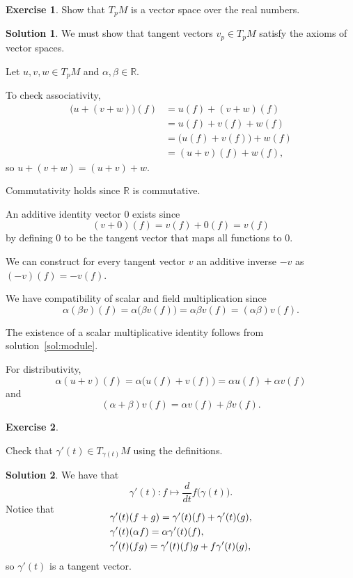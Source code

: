\documentclass[11pt, a4paper]{report}
\theoremstyle{definition}
\newtheorem{exercise}{Exercise}[part]
\newtheorem{solution}{Solution}[part]
\newenvironment{ex}{\begin{exercise}}{\end{exercise}\pagebreak[1]}
\newenvironment{sol}{\begin{solution}}{\end{solution}\pagebreak[3]}
\begin{document}
\begin{ex}

Show that $T_p M$ is a vector space over the real numbers.

\end{ex}

\begin{sol}

We must show that tangent vectors $v_p \in T_p M$ satisfy the axioms of vector spaces.

Let $u, v, w \in T_p M$ and $\alpha, \beta \in \mathbb{R}$.

To check associativity,
\begin{align*}
    \bigl(u + (v + w) \bigr) (f) &= u(f) + (v + w)(f) \\
                     &= u(f) + v(f) + w(f) \\
                     &= \bigl(u(f) + v(f)\bigr) + w(f) \\
                     &= (u + v)(f) + w(f),
\end{align*}
so $u + (v + w) = (u + v) + w$.

Commutativity holds since $\mathbb{R}$ is commutative.

An additive identity vector $0$ exists since
\[
    (v + 0)(f) = v(f) + 0(f) = v(f)
\]
by defining $0$ to be the tangent vector that maps all functions to $0$.

We can construct for every tangent vector $v$ an additive inverse $-v$ as $(-v)(f) = -v(f)$.

We have compatibility of scalar and field multiplication since
\[
    \alpha(\beta v)(f) = \alpha \bigl(\beta v(f)\bigr)
        = \alpha \beta v(f) = (\alpha \beta) v(f).
\]

The existence of a scalar multiplicative identity follows from solution~\ref{sol:module}.

For distributivity,
\[
    \alpha(u + v)(f) = \alpha \bigl(u(f) + v(f)\bigr) = \alpha u(f) + \alpha v(f)
\]
and
\[
    (\alpha + \beta) v(f) = \alpha v(f) + \beta v(f).
\]

\end{sol}

\begin{ex}\label{ex:tangentvector}

Check that $\gamma'(t) \in T_{\gamma(t)}M$ using the definitions.

\end{ex}

\begin{sol}

We have that
\[
    \gamma'(t): f \mapsto \frac{d}{dt} f\bigl( \gamma(t) \bigr).
\]
Notice that
\begin{align*}
    \SwapAboveDisplaySkip
    &\gamma'(t)(f + g) = \gamma'(t)(f) + \gamma'(t)(g), \\
    &\gamma'(t)(\alpha f) = \alpha \gamma'(t)(f), \\
    &\gamma'(t)(f g) = \gamma'(t)(f) g + f \gamma'(t)(g),
\end{align*}
so $\gamma'(t)$ is a tangent vector.

\end{sol}
\end{document}

